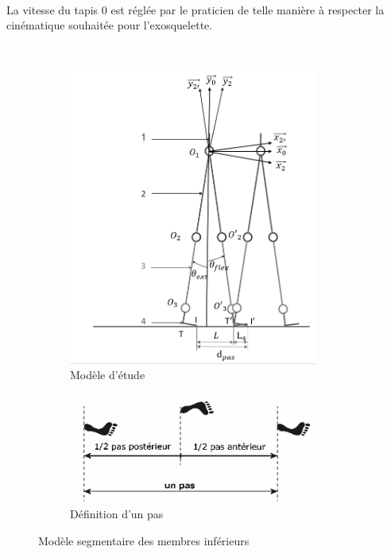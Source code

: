 ~\

La vitesse du tapis 0 est réglée par le praticien de telle manière à respecter la cinématique souhaitée pour l'exosquelette.


~\




\begin{figure}[ht!]
    \begin{subfigure}[b]{0.45\textwidth}
      \centering\includegraphics[width=0.9\textwidth]{img/fig08a}
      \caption{\label{fig08a} Modèle d'étude}
    \end{subfigure}
    \hfill
    \begin{subfigure}[b]{0.45\textwidth}
      \centering\includegraphics[width=0.9\textwidth]{img/fig08b}
      \caption{\label{fig08b} Définition d'un pas}
    \end{subfigure}
    \caption{\label{fig08} Modèle segmentaire des membres inférieurs}
\end{figure}

